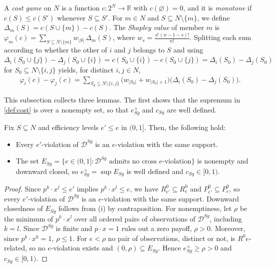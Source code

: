 \documentclass[11 pt]{article}
\begin{document}
A \emph{cost game} on $N$ is a function $c : 2^{N} \to \mathbb{R}$ with $c(\varnothing) = 0$, and it is \emph{monotone} if $c(S) \leq c(S')$ whenever $S \subseteq S'$. For $m \in N$ and $S \subseteq N \setminus \{m\}$, we define $\Delta_{m}(S) = c(S \cup \{m\}) - c(S)$. The \emph{Shapley value} of member $m$ is $\varphi_{m}(c) = \sum_{S \subseteq N \setminus \{m\}} w_{|S|}\, \Delta_{m}(S)$, where $w_{s} = \frac{s!\,(n-1-s)!}{n!}$. Splitting each sum according to whether the other of $i$ and $j$ belongs to $S$ and using $\Delta_{i}(S_0 \cup \{j\}) - \Delta_{j}(S_0 \cup \{i\}) = c(S_0 \cup \{i\}) - c(S_0 \cup \{j\}) = \Delta_{i}(S_0) - \Delta_{j}(S_0)$ for $S_0 \subseteq N \setminus \{i,j\}$ yields, for distinct $i, j \in N$,
\begin{align}\label{eqn:app_phi_diff}
\varphi_{i}(c) - \varphi_{j}(c) = \sum_{S_0 \subseteq N \setminus \{i,j\}} \bigl( w_{|S_0|} + w_{|S_0|+1} \bigr) \bigl( \Delta_{i}(S_0) - \Delta_{j}(S_0) \bigr).
\end{align}

This subsection collects three lemmas. The first shows that the supremum in \autoref{def:cost} is over a nonempty set, so that $e^{\times}_{Sg}$ and $c_{Sg}$ are well defined.

\begin{lemma}\label{lem:app_persist}
Fix $S \subseteq N$ and efficiency levels $e' \leq e$ in $(0,1]$. Then, the following hold:
\begin{itemize}
\item[(i)] Every $e'$-violation of $\mathcal{D}^{Sg}$ is an $e$-violation with the same support.    
\item[(ii)] The set $E_{Sg} = \{ e \in (0,1] : \mathcal{D}^{Sg} \text{ admits no cross } e\text{-violation} \}$ is nonempty and downward closed, so $e^{\times}_{Sg} = \sup E_{Sg}$ is well defined and $c_{Sg} \in [0,1)$.
\end{itemize} 
\end{lemma}

\begin{proof}
Since $p^{k} \cdot x^{l} \leq e'$ implies $p^{k} \cdot x^{l} \leq e$, we have $\mathrel{R^{0}_{e'}} \subseteq \mathrel{R^{0}_{e}}$ and $\mathrel{P^{0}_{e'}} \subseteq \mathrel{P^{0}_{e}}$, so every $e'$-violation of $\mathcal{D}^{Sg}$ is an $e$-violation with the same support. Downward closedness of $E_{Sg}$ follows from (i) by contraposition. For nonemptiness, let $\rho$ be the minimum of $p^{k} \cdot x^{l}$ over all ordered pairs of observations of $\mathcal{D}^{Sg}$, including $k = l$. Since $\mathcal{D}^{Sg}$ is finite and $p \cdot x = 1$ rules out a zero payoff, $\rho > 0$. Moreover, since $p^{k} \cdot x^{k} = 1$, $\rho \leq 1$. For $e < \rho$ no pair of observations, distinct or not, is $\mathrel{R^{0}{e}}$-related, so no $e$-violation exists and $(0, \rho) \subseteq E_{Sg}$. Hence $e^{\times}_{Sg} \geq \rho > 0$ and $c_{Sg} \in [0,1)$.
\end{proof}
\end{document}
